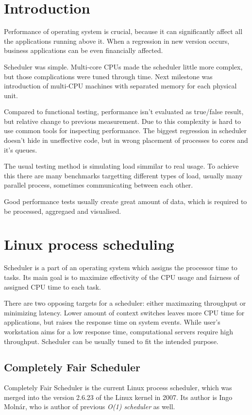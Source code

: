 \chapter{Introduction}
Performance of operating system is crucial, because it can significantly affect all the applications running above it.
When a regression in new version occurs, business applications can be even financially affected.

Scheduler was simple. Multi-core CPUs made the scheduler little more complex, but those complications were tuned through time.
Next milestone was introduction of multi-CPU machines with separated memory for each physical unit.

Compared to functional testing, performance isn't evaluated as true/false result, but relative change to previous measurement.
Due to this complexity is hard to use common tools for inspecting performance.
The biggest regression in scheduler doesn't hide in uneffective code, but in wrong placement of processes to cores and it's queues.

The usual testing method is simulating load simmilar to real usage.
To achieve this there are many benchmarks targetting different types of load, usually many parallel process, sometimes communicating between each other.

Good performance tests usually create great amount of data, which is required to be processed, aggregaed and visualised.

\chapter{Linux process scheduling}
Scheduler is a part of an operating system which assigns the processor time to tasks.
Its main goal is to maximize effectivity of the CPU usage and fairness of assigned
CPU time to each task.

There are two opposing targets for a scheduler: either maximazing throughput or
minimizing latency. Lower amount of context switches leaves more CPU time for
applications, but raises the response time on system events.
While user's workstation aims for a low response time, computational servers
require high throughput. Scheduler can be usually tuned to fit the intended
purpose.

\section{Completely Fair Scheduler}
Completely Fair Scheduler is the current Linux process scheduler, which was
merged into the version
2.6.23 of the Linux kernel in 2007. Its author is Ingo Molnár, who is author of previous
\emph{O(1) scheduler} as well.

